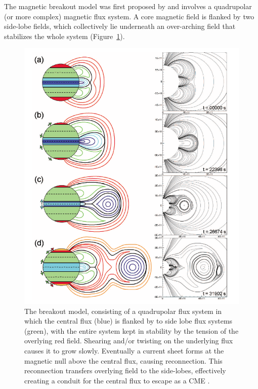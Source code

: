 The magnetic breakout model was first proposed by \citet{antiochos1999} and involves a quadrupolar (or more complex) magnetic flux system. A core magnetic field is flanked by two side-lobe fields, which collectively lie underneath an over-arching field that stabilizes the whole system (Figure~\ref{fig:breakout_model}). 
\begin{figure}[!t]
\begin{center}
\includegraphics[scale=0.45, trim=0cm 0cm 0cm 1cm]{images/lynch_breakout}
\caption[The breakout CME model]{The breakout model, consisting of a quadrupolar flux system in which the central flux (blue) is flanked by to side lobe flux systems (green), with the entire system kept in stability by the tension of the overlying red field. Shearing and/or twisting on the underlying flux causes it to grow slowly. Eventually a current sheet forms at the magnetic null above the central flux, causing reconnection. This reconnection transfers overlying field to the side-lobes, effectively creating a conduit for the central flux to escape as a CME \citep{lynch2008}.}
\label{fig:breakout_model}
\end{center}
\end{figure}

